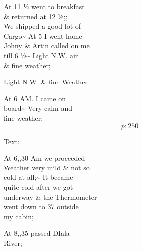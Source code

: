 \documentclass{report}
\begin{document}
	\par{
 	At 11 ½ went to breakfast\ \\\& returned at 12 ½;;\ \\We shipped a good lot of\ \\Cargo\~{} At 5 I went home\ \\Johny \& Artin called on me\ \\till 6 ½\~{} Light N.W. air\ \\\& fine weather;\ \\
	}

	\par{
 	Light N.W. \& fine Weather\ \\
	}

	\par{
 	At 6 AM. I came on\ \\board\~{} Very calm and\ \\fine weather;\ \\
  \[p: 250 \]

	}






	\par{
 	Text:\ \\
	}

	\par{
 	At 6,,30 Am we proceeded\ \\Weather very mild \& not so\ \\cold at all;\~{} It became\ \\quite cold after we got\ \\underway \& the Thermometer\ \\went down to 37 outside\ \\my cabin;\ \\
	}

	\par{
 	At 8,,35 passed DIala\ \\River;\ \\
	}
\end{document}
